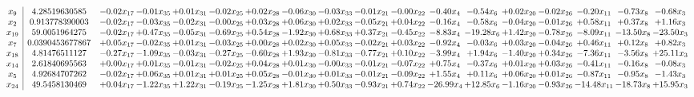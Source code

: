 \documentclass[9pt]{article}
\begin{document}
 \[\begin{array}{c| c c@{\hskip 2pt} c@{\hskip 2pt} c@{\hskip 2pt} c@{\hskip 2pt} c@{\hskip 2pt} c@{\hskip 2pt} c@{\hskip 2pt} c@{\hskip 2pt} c@{\hskip 2pt} c@{\hskip 2pt} c@{\hskip 2pt} c@{\hskip 2pt} c@{\hskip 2pt} c@{\hskip 2pt} c@{\hskip 2pt} c@{\hskip 2pt} }
 x_{9}   &  4.28519630585 & -0.02 x_{17} & -0.01 x_{35} & +  0.01 x_{31} & -0.02 x_{25} & +  0.02 x_{28} & -0.06 x_{30} & -0.03 x_{33} & -0.01 x_{21} & -0.00 x_{22} & -0.40 x_{4} & -0.54 x_{6} & +  0.02 x_{20} & -0.02 x_{26} & -0.20 x_{11} & -0.73 x_{8} & -0.68 x_{3}\\
 x_{2}   &  0.913778390003 & -0.02 x_{17} & -0.03 x_{35} & -0.02 x_{31} & -0.00 x_{25} & +  0.03 x_{28} & +  0.06 x_{30} & +  0.02 x_{33} & -0.05 x_{21} & +  0.04 x_{22} & -0.16 x_{4} & -0.58 x_{6} & -0.04 x_{20} & -0.01 x_{26} & +  0.58 x_{11} & +  0.37 x_{8} & +  1.16 x_{3}\\
 x_{19}   &  59.0051964275 & -0.02 x_{17} & +  0.47 x_{35} & -0.05 x_{31} & -0.69 x_{25} & +  0.54 x_{28} & -1.92 x_{30} & +  0.68 x_{33} & +  0.37 x_{21} & -0.45 x_{22} & -8.83 x_{4} & -19.28 x_{6} & +  1.42 x_{20} & -0.78 x_{26} & -8.09 x_{11} & -13.50 x_{8} & -23.50 x_{3}\\
 x_{7}   &  0.0390453677867 & +  0.05 x_{17} & -0.02 x_{35} & +  0.01 x_{31} & -0.03 x_{25} & +  0.00 x_{28} & +  0.02 x_{30} & +  0.05 x_{33} & -0.02 x_{21} & +  0.03 x_{22} & -0.92 x_{4} & -0.03 x_{6} & +  0.03 x_{20} & -0.04 x_{26} & +  0.46 x_{11} & +  0.12 x_{8} & +  0.82 x_{3}\\
 x_{18}   &  4.81476511127 & -0.27 x_{17} & -1.09 x_{35} & -0.03 x_{31} & -0.27 x_{25} & -0.60 x_{28} & +  1.93 x_{30} & -0.81 x_{33} & -0.77 x_{21} & +  0.10 x_{22} & -3.99 x_{4} & +  1.94 x_{6} & -1.40 x_{20} & +  0.34 x_{26} & -7.36 x_{11} & -3.56 x_{8} & + 25.11 x_{3}\\
 x_{14}   &  2.61840695563 & +  0.00 x_{17} & +  0.01 x_{35} & -0.01 x_{31} & -0.02 x_{25} & +  0.04 x_{28} & +  0.01 x_{30} & -0.00 x_{33} & -0.01 x_{21} & -0.07 x_{22} & +  0.75 x_{4} & -0.37 x_{6} & +  0.01 x_{20} & +  0.03 x_{26} & -0.41 x_{11} & -0.16 x_{8} & -0.08 x_{3}\\
 x_{5}   &  4.92684707262 & -0.02 x_{17} & +  0.06 x_{35} & +  0.01 x_{31} & +  0.01 x_{25} & +  0.05 x_{28} & -0.01 x_{30} & +  0.01 x_{33} & -0.01 x_{21} & -0.09 x_{22} & +  1.55 x_{4} & +  0.11 x_{6} & +  0.06 x_{20} & +  0.01 x_{26} & -0.87 x_{11} & -0.95 x_{8} & -1.43 x_{3}\\
 x_{24}   &  49.5458130469 & +  0.04 x_{17} & -1.22 x_{35} & +  1.22 x_{31} & -0.19 x_{25} & -1.25 x_{28} & +  1.81 x_{30} & +  0.50 x_{33} & -0.93 x_{21} & +  0.74 x_{22} & -26.99 x_{4} & + 12.85 x_{6} & -1.16 x_{20} & -0.93 x_{26} & -14.48 x_{11} & -18.73 x_{8} & + 15.95 x_{3}\\

\end{array}\]
\end{document}
